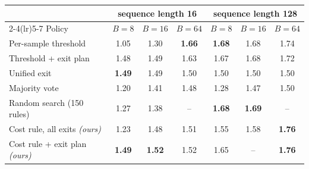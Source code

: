 \begin{tabular}{@{}lcccccc@{}}
\toprule
 & \multicolumn{3}{c}{sequence length 16} & \multicolumn{3}{c}{sequence length 128} \\
\cmidrule(lr){2-4}\cmidrule(lr){5-7}
Policy & $B=8$ & $B=16$ & $B=64$ & $B=8$ & $B=16$ & $B=64$ \\
\midrule
Per-sample threshold & 1.05 & 1.30 & \textbf{1.66} & \textbf{1.68} & 1.68 & 1.74 \\
Threshold + exit plan & 1.48 & 1.49 & 1.63 & 1.67 & 1.68 & 1.72 \\
Unified exit & \textbf{1.49} & 1.49 & 1.50 & 1.50 & 1.50 & 1.50 \\
Majority vote & 1.20 & 1.41 & 1.48 & 1.28 & 1.47 & 1.50 \\
Random search (150 rules) & 1.27 & 1.38 & -- & \textbf{1.68} & \textbf{1.69} & -- \\
\midrule
Cost rule, all exits \textit{(ours)} & 1.23 & 1.48 & 1.51 & 1.55 & 1.58 & \textbf{1.76} \\
Cost rule + exit plan \textit{(ours)} & \textbf{1.49} & \textbf{1.52} & 1.52 & 1.65 & -- & \textbf{1.76} \\
\bottomrule
\end{tabular}
